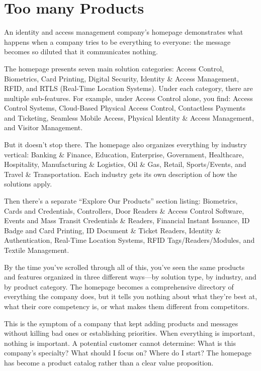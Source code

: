 \section{Too many Products}

An identity and access management company's homepage demonstrates what happens when a company tries to be everything to everyone: the message becomes so diluted that it communicates nothing.

The homepage presents seven main solution categories: Access Control, Biometrics, Card Printing, Digital Security, Identity \& Access Management, RFID, and RTLS (Real-Time Location Systems). Under each category, there are multiple sub-features. For example, under Access Control alone, you find: Access Control Systems, Cloud-Based Physical Access Control, Contactless Payments and Ticketing, Seamless Mobile Access, Physical Identity \& Access Management, and Visitor Management.

But it doesn't stop there. The homepage also organizes everything by industry vertical: Banking \& Finance, Education, Enterprise, Government, Healthcare, Hospitality, Manufacturing \& Logistics, Oil \& Gas, Retail, Sports/Events, and Travel \& Transportation. Each industry gets its own description of how the solutions apply.

Then there's a separate ``Explore Our Products'' section listing: Biometrics, Cards and Credentials, Controllers, Door Readers \& Access Control Software, Events and Mass Transit Credentials \& Readers, Financial Instant Issuance, ID Badge and Card Printing, ID Document \& Ticket Readers, Identity \& Authentication, Real-Time Location Systems, RFID Tags/Readers/Modules, and Textile Management.

By the time you've scrolled through all of this, you've seen the same products and features organized in three different ways—by solution type, by industry, and by product category. The homepage becomes a comprehensive directory of everything the company does, but it tells you nothing about what they're best at, what their core competency is, or what makes them different from competitors.

This is the symptom of a company that kept adding products and messages without killing bad ones or establishing priorities. When everything is important, nothing is important. A potential customer cannot determine: What is this company's specialty? What should I focus on? Where do I start? The homepage has become a product catalog rather than a clear value proposition.

